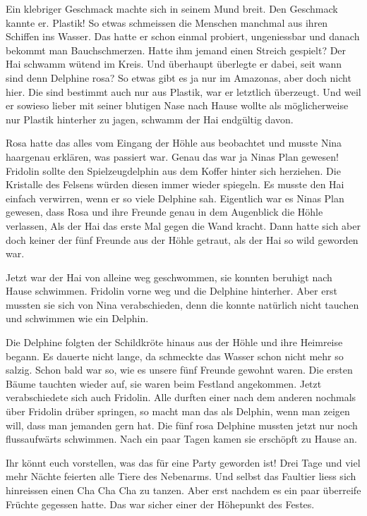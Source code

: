 Ein klebriger Geschmack machte sich in seinem Mund breit. Den Geschmack kannte er. Plastik! So etwas schmeissen die Menschen manchmal aus ihren Schiffen ins Wasser. Das hatte er schon einmal probiert, ungeniessbar und danach bekommt man Bauchschmerzen. Hatte ihm jemand einen Streich gespielt? Der Hai schwamm wütend im Kreis. Und überhaupt überlegte er dabei, seit wann sind denn Delphine rosa? So etwas gibt es ja nur im Amazonas, aber doch nicht hier. Die sind bestimmt auch nur aus Plastik, war er letztlich überzeugt.  Und weil er sowieso lieber mit seiner blutigen Nase nach Hause wollte als möglicherweise nur Plastik hinterher zu jagen, schwamm der Hai endgültig davon.

Rosa hatte das alles vom Eingang der Höhle aus beobachtet und musste Nina haargenau erklären, was passiert war. Genau das war ja Ninas Plan gewesen! Fridolin sollte den Spielzeugdelphin aus dem Koffer hinter sich herziehen. Die Kristalle des Felsens würden diesen immer wieder spiegeln. Es musste den Hai einfach verwirren, wenn er so viele Delphine sah. Eigentlich war es Ninas Plan gewesen, dass Rosa und ihre Freunde genau in dem Augenblick die Höhle verlassen, Als der Hai das erste Mal gegen die Wand kracht. Dann hatte sich aber doch keiner der fünf Freunde aus der Höhle getraut, als der Hai so wild geworden war.

Jetzt war der Hai von alleine weg geschwommen, sie konnten beruhigt nach Hause schwimmen. Fridolin vorne weg und die Delphine hinterher. Aber erst mussten sie sich von Nina verabschieden, denn die konnte natürlich nicht tauchen und schwimmen wie ein Delphin. 

Die Delphine folgten der Schildkröte hinaus aus der Höhle und ihre Heimreise begann. Es dauerte nicht lange, da schmeckte das Wasser schon nicht mehr so salzig. Schon bald war so, wie es unsere fünf Freunde gewohnt waren. Die ersten Bäume tauchten wieder auf, sie waren beim Festland angekommen. Jetzt verabschiedete sich auch Fridolin. Alle durften einer nach dem anderen nochmals über Fridolin drüber springen, so macht man das als Delphin, wenn man zeigen will, dass man jemanden gern hat. Die fünf rosa Delphine mussten jetzt nur noch flussaufwärts schwimmen. Nach ein paar Tagen kamen sie erschöpft zu Hause an.

Ihr könnt euch vorstellen, was das für eine Party geworden ist! Drei Tage und viel mehr Nächte feierten alle Tiere des Nebenarms. Und selbst das Faultier liess sich hinreissen einen Cha Cha Cha zu tanzen. Aber erst nachdem es ein paar überreife Früchte gegessen hatte. Das war sicher einer der Höhepunkt des Festes. 

